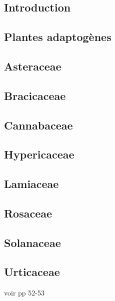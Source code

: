 

\subsection{Introduction}


\subsection{Plantes adaptogènes}


\subsection{Asteraceae}


\subsection{Bracicaceae}


\subsection{Cannabaceae}


\subsection{Hypericaceae}


\subsection{Lamiaceae}


\subsection{Rosaceae}


\subsection{Solanaceae}


\subsection{Urticaceae}


voir \cite{laporte2023} pp 52-53
